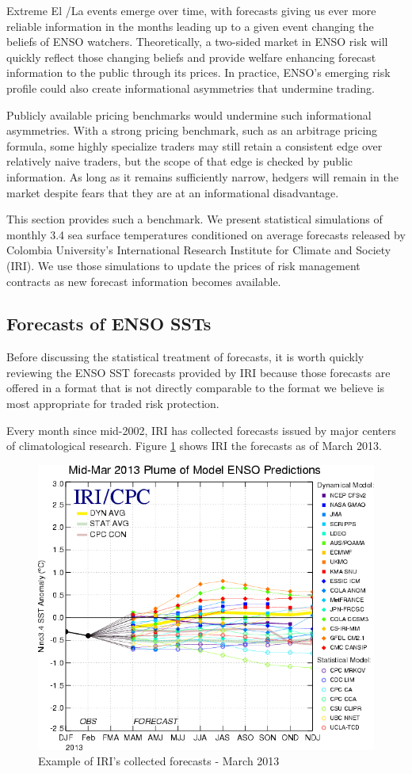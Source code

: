 \documentclass[article]{jss}
\begin{document}
Extreme El /La  events emerge over time, with
forecasts giving us ever more reliable information in the months leading
up to a given event changing the beliefs of ENSO watchers.
Theoretically, a two-sided market in ENSO risk will quickly reflect
those changing beliefs and provide welfare enhancing forecast
information to the public through its prices. In practice, ENSO's
emerging risk profile could also create informational asymmetries that
undermine trading.

Publicly available pricing benchmarks would undermine such informational
asymmetries. With a strong pricing benchmark, such as an arbitrage
pricing formula, some highly specialize traders may still retain a
consistent edge over relatively naive traders, but the scope of that
edge is checked by public information. As long as it remains
sufficiently narrow, hedgers will remain in the market despite fears
that they are at an informational disadvantage.

This section provides such a benchmark. We present statistical
simulations of monthly  3.4 sea surface temperatures
conditioned on average forecasts released by Colombia University's
International Research Institute for Climate and Society (IRI). We use
those simulations to update the prices of risk management contracts as
new forecast information becomes available.

\subsection{Forecasts of ENSO SSTs}\label{forecasts-of-enso-ssts}

Before discussing the statistical treatment of forecasts, it is worth
quickly reviewing the ENSO SST forecasts provided by IRI because those
forecasts are offered in a format that is not directly comparable to the
format we believe is most appropriate for traded  risk
protection.

Every month since mid-2002, IRI has collected forecasts issued by major
centers of climatological research. Figure \ref{fig:forecastExamples}
shows IRI the forecasts as of March 2013.

\begin{figure}
  \begin{center}
  \includegraphics[width=.5\linewidth]{img/SST_table_march_ex.png}
  \caption{Example of IRI's collected forecasts - March 2013}
   \label{fig:forecastExamples}
   \end{center}
\end{figure}
\end{document}

